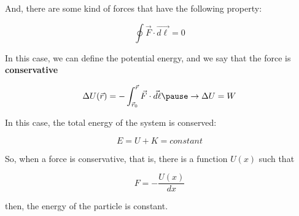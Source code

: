 \documentclass[]{beamer}
\begin{document}

\begin{frame}

 And, there are some kind of forces that have the following property: 

 \begin{equation}
  \oint\vec{F}\cdot \vec{d\ell}=0
\end{equation}

\pause
In this case, we can define the potential energy, and we say that the force is \textbf{conservative}


\begin{equation}
  \Delta U(\vec{r})=-\int^{\vec{r}}_{\vec{r}_0}\vec{F}\cdot \vec{d\ell}\pause \rightarrow \Delta U=W
\end{equation}

\pause

In this case, the total energy of the system is conserved:
\pause

\begin{equation}
 E=U+K=constant
\end{equation}

\end{frame}
  


\begin{frame}

So, when a force is conservative, that is, there is a function $U(x)$ such that

\begin{equation}
  F=-\frac{U(x)}{dx}
\end{equation}
 
then, the energy of the particle is constant. 


 \end{frame}
   
\end{document}
